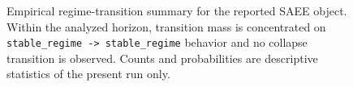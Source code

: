 \begin{figure}[t]
\centering
{}
\caption{Empirical regime-transition summary for the reported SAEE object.
Within the analyzed horizon, transition mass is concentrated on
\texttt{stable\_regime -> stable\_regime} behavior and no collapse transition
is observed. Counts and probabilities are descriptive statistics of the
present run only.}
\label{fig:regime-stability}
\end{figure}
